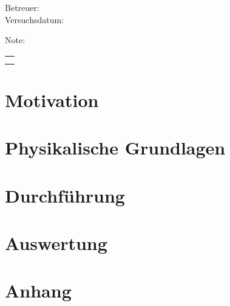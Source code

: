 \documentclass[numbers=noenddot,a4paper]{article}
\title{\fett{\underline{Protokoll:}}} %
\author{Alexander Jankowski, Philipp Hacker}
\date{\today}
\begin{document}
	\renewcommand*{\equationautorefname}{Gl.}
	\renewcommand*{\figureautorefname}{Abb.}
	\renewcommand*{\tableautorefname}{Tab.}
	\renewcommand*{\sectionautorefname}{Abschn.}
	\renewcommand*{\subsectionautorefname}{Abschn.}
	\renewcommand*{\subsubsectionautorefname}{Abschn.}
	\renewcommand*{\figurename}{Abb. }
	\renewcommand*{\tablename}{Tab.}

	\renewcommand*{\figurename}{Abbildung }
	\renewcommand*{\tablename}{Tabelle}


	\maketitle

	\begin{center}
		Betreuer: \\ %
		Versuchsdatum: \\ %
		\begin{table}[h]
			\centering
			Note: %
			\begin{tabularx}{1.5cm}{|X|}
				\hline \\ \\
				\hline
			\end{tabularx}
		\end{table}
	\end{center}


	\vspace*{\fill}
	\tableofcontents
	\vfill
	\clearpage

	\section{Motivation}



	\clearpage
	\section{Physikalische Grundlagen}



	\clearpage
	\section{Durchführung}



	\clearpage
	\section{Auswertung}



	\clearpage
	\section{Anhang}

		
		
\end{document}
